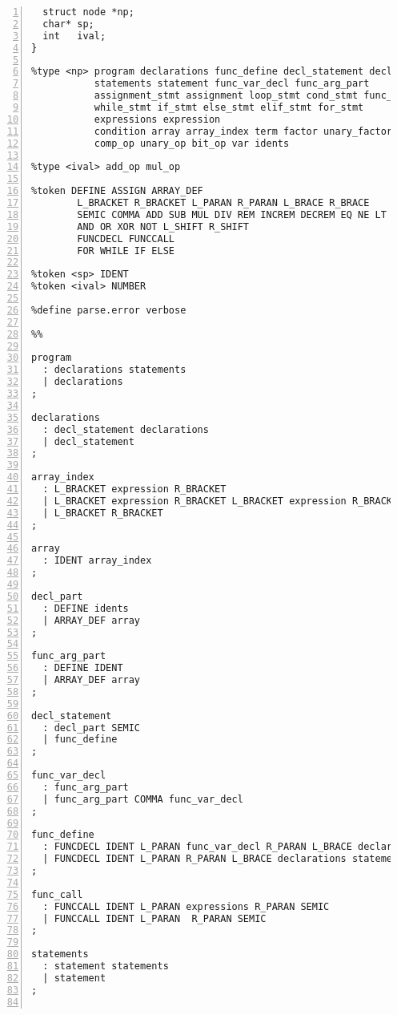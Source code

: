 \begin{Verbatim}[numbers=left, xleftmargin=10mm, numbersep=6pt, frame=single,
                    fontsize=\small, baselinestretch=0.8]
%union {
  struct node *np;
  char* sp;
  int   ival;
}

%type <np> program declarations func_define decl_statement decl_part
           statements statement func_var_decl func_arg_part
           assignment_stmt assignment loop_stmt cond_stmt func_call 
           while_stmt if_stmt else_stmt elif_stmt for_stmt
           expressions expression 
           condition array array_index term factor unary_factor 
           comp_op unary_op bit_op var idents

%type <ival> add_op mul_op

%token DEFINE ASSIGN ARRAY_DEF 
        L_BRACKET R_BRACKET L_PARAN R_PARAN L_BRACE R_BRACE
        SEMIC COMMA ADD SUB MUL DIV REM INCREM DECREM EQ NE LT GT LTE GTE
        AND OR XOR NOT L_SHIFT R_SHIFT
        FUNCDECL FUNCCALL
        FOR WHILE IF ELSE

%token <sp> IDENT
%token <ival> NUMBER

%define parse.error verbose

%%

program
  : declarations statements 
  | declarations           
;

declarations
  : decl_statement declarations 
  | decl_statement             
;

array_index
  : L_BRACKET expression R_BRACKET 
  | L_BRACKET expression R_BRACKET L_BRACKET expression R_BRACKET 
  | L_BRACKET R_BRACKET 
;

array
  : IDENT array_index 
;

decl_part
  : DEFINE idents 
  | ARRAY_DEF array 
;

func_arg_part
  : DEFINE IDENT
  | ARRAY_DEF array 
;

decl_statement
  : decl_part SEMIC 
  | func_define     
;

func_var_decl
  : func_arg_part         
  | func_arg_part COMMA func_var_decl 
;

func_define
  : FUNCDECL IDENT L_PARAN func_var_decl R_PARAN L_BRACE declarations statements R_BRACE 
  | FUNCDECL IDENT L_PARAN R_PARAN L_BRACE declarations statements R_BRACE
;

func_call
  : FUNCCALL IDENT L_PARAN expressions R_PARAN SEMIC 
  | FUNCCALL IDENT L_PARAN  R_PARAN SEMIC 
;

statements
  : statement statements 
  | statement          
;


\end{Verbatim}

